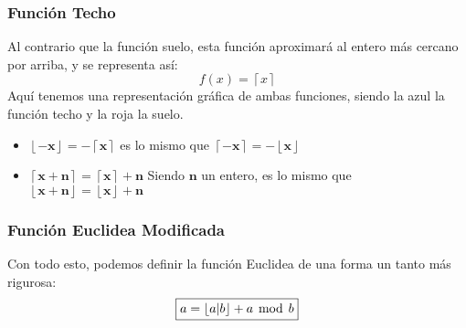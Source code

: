 \subsubsection{Función Techo}
\noindent Al contrario que la función suelo, esta función aproximará al entero más cercano por arriba, y se representa así:
\[
        \boxed{f(x) = \left \lceil x \right \rceil}
\]
\noindent Aquí tenemos una representación gráfica de ambas funciones, siendo la azul la función techo y la roja la suelo.
\begin{adjustwidth}{10em}{5em}
\end{adjustwidth}
\noindent{} \par
\begin{itemize}
        \item \(\mathbf{\left \lfloor -x \right \rfloor = - \left \lceil x \right \rceil}\) es lo mismo que \(\mathbf{\left \lceil -x \right \rceil = - \left \lfloor x \right \rfloor}\)
        \item \(\mathbf{\left \lceil x+n \right \rceil = \left \lceil x \right \rceil +n}\) Siendo \(\mathbf{n}\) un entero, es lo mismo que \(\mathbf{\left \lfloor x+n \right \rfloor = \left \lfloor x \right \rfloor +n}\)
\end{itemize}
\subsubsection{Función Euclidea Modificada}
\noindent Con todo esto, podemos definir la función Euclidea de una forma un tanto más rigurosa:
\[
        \boxed{a = \left \lfloor a|b \right \rfloor + a \hspace{1.5mm} \textnormal{mod} \hspace{1.5mm} b}
\]
